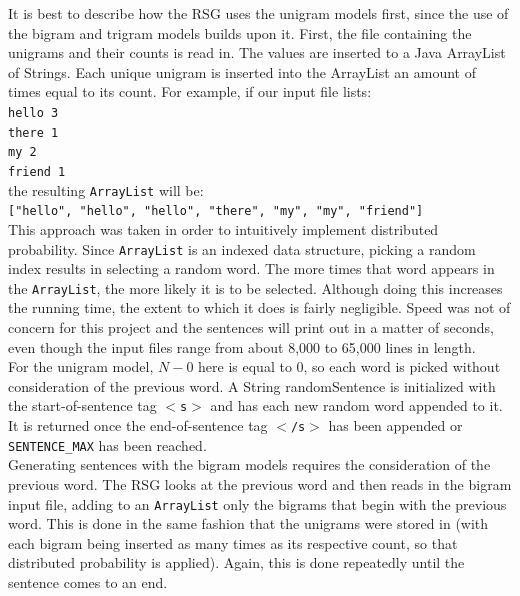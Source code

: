 \documentclass{article} %
\begin{document}
It is best to describe how the RSG uses the unigram models first, since the use of the bigram and trigram models builds upon it. First, the file containing the unigrams and their counts is read in. The values are inserted to a Java ArrayList of Strings. Each unique unigram is inserted into the ArrayList an amount of times equal to its count. For example, if our input file lists:\\

\texttt{hello 3\\
there 1\\
my 2\\
friend 1}\\

the resulting  \texttt{ArrayList} will be:\\

\texttt{["hello", "hello", "hello", "there", "my", "my", "friend"]}\\

This approach was taken in order to intuitively implement distributed probability. Since  \texttt{ArrayList} is an indexed data structure, picking a random index results in selecting a random word. The more times that word appears in the  \texttt{ArrayList}, the more likely it is to be selected. Although doing this increases the running time, the extent to which it does is fairly negligible. Speed was not of concern for this project and the sentences will print out in a matter of seconds, even though the input files range from about 8,000 to 65,000 lines in length.\\

For the unigram model, $N - 0$ here is equal to 0, so each word is picked without consideration of the previous word. A String randomSentence is initialized with the start-of-sentence tag  \texttt{$<$s$>$} and has each new random word appended to it. It is returned once the end-of-sentence tag  \texttt{$<$/s$>$} has been appended or  \texttt{SENTENCE\_MAX} has been reached.\\

Generating sentences with the bigram models requires the consideration of the previous word. The RSG looks at the previous word and then reads in the bigram input file, adding to an  \texttt{ArrayList} only the bigrams that begin with the previous word. This is done in the same fashion that the unigrams were stored in (with each bigram being inserted as many times as its respective count, so that distributed probability is applied). Again, this is done repeatedly until the sentence comes to an end.\\
\end{document}

